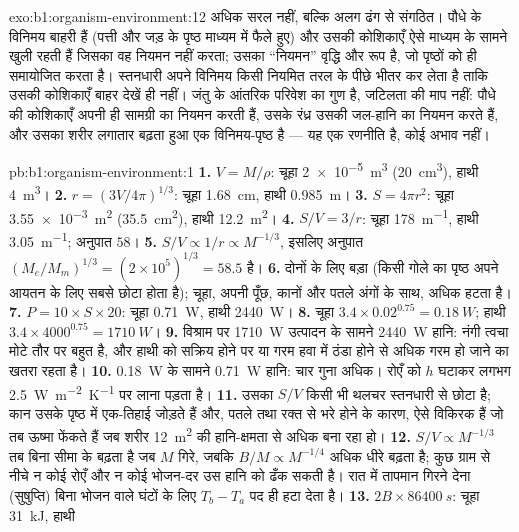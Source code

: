 \begin{solution}{exo:b1:organism-environment:12}
अधिक सरल नहीं, बल्कि अलग ढंग से संगठित। पौधे के विनिमय बाहरी हैं (पत्ती
और जड़ के पृष्ठ माध्यम में फैले हुए) और उसकी कोशिकाएँ ऐसे माध्यम के सामने
खुली रहती हैं जिसका वह नियमन नहीं करता; उसका ``नियमन'' वृद्धि और रूप है,
जो पृष्ठों को ही समायोजित करता है। स्तनधारी अपने विनिमय किसी नियमित तरल
के पीछे भीतर कर लेता है ताकि उसकी कोशिकाएँ बाहर देखें ही नहीं। 
जंतु के आंतरिक परिवेश का गुण है, जटिलता की माप नहीं: पौधे की कोशिकाएँ
अपनी ही सामग्री का नियमन करती हैं, उसके रंध्र उसकी जल-हानि का नियमन करते
हैं, और उसका शरीर लगातार बढ़ता हुआ एक विनिमय-पृष्ठ है --- यह एक रणनीति
है, कोई अभाव नहीं।
\end{solution}

\begin{solution}{pb:b1:organism-environment:1}
\textbf{1.} $V = M/\rho$: चूहा \qty{2e-5}{m^3} (\qty{20}{cm^3}),
हाथी \qty{4}{m^3}।
\textbf{2.} $r = (3V/4\pi)^{1/3}$: चूहा \qty{1.68}{cm}, हाथी
\qty{0.985}{m}।
\textbf{3.} $S = 4\pi r^2$: चूहा \qty{3.55e-3}{m^2} (\qty{35.5}{cm^2}),
हाथी \qty{12.2}{m^2}।
\textbf{4.} $S/V = 3/r$: चूहा \qty{178}{m^{-1}}, हाथी
\qty{3.05}{m^{-1}}; अनुपात $58$।
\textbf{5.} $S/V \propto 1/r \propto M^{-1/3}$, इसलिए अनुपात
$(M_e/M_m)^{1/3} = (2\times 10^5)^{1/3} = 58.5$ है।
\textbf{6.} दोनों के लिए बड़ा (किसी गोले का पृष्ठ अपने आयतन के लिए सबसे
छोटा होता है); चूहा, अपनी पूँछ, कानों और पतले अंगों के साथ, अधिक हटता
है।
\textbf{7.} $P = 10\times S\times 20$: चूहा \qty{0.71}{W}, हाथी
\qty{2440}{W}।
\textbf{8.} चूहा $3.4\times 0.02^{0.75} = \qty{0.18}{W}$; हाथी
$3.4\times 4000^{0.75} = \qty{1710}{W}$।
\textbf{9.} विश्राम पर \qty{1710}{W} उत्पादन के सामने \qty{2440}{W}
हानि: नंगी त्वचा मोटे तौर पर बहुत है, और हाथी को सक्रिय होने पर या गरम
हवा में ठंडा होने से अधिक गरम हो जाने का खतरा रहता है।
\textbf{10.} \qty{0.18}{W} के सामने \qty{0.71}{W} हानि: चार गुना अधिक।
रोएँ को $h$ घटाकर लगभग \qty{2.5}{W.m^{-2}.K^{-1}} पर लाना पड़ता है।
\textbf{11.} उसका $S/V$ किसी भी थलचर स्तनधारी से छोटा है; कान उसके पृष्ठ
में एक-तिहाई जोड़ते हैं और, पतले तथा रक्त से भरे होने के कारण, ऐसे
विकिरक हैं जो तब ऊष्मा फेंकते हैं जब शरीर \qty{12}{m^2} की हानि-क्षमता से
अधिक बना रहा हो।
\textbf{12.} $S/V \propto M^{-1/3}$ तब बिना सीमा के बढ़ता है जब
$M$ गिरे, जबकि $B/M \propto M^{-1/4}$ अधिक धीरे बढ़ता है; कुछ ग्राम से नीचे न
कोई रोएँ और न कोई भोजन-दर उस हानि को ढँक सकती है। रात में तापमान गिरने
देना (सुषुप्ति) बिना भोजन वाले घंटों के लिए $T_b - T_a$ पद ही हटा देता है।
\textbf{13.} $2B\times\qty{86400}{s}$: चूहा \qty{31}{kJ}, हाथी

\end{solution}
